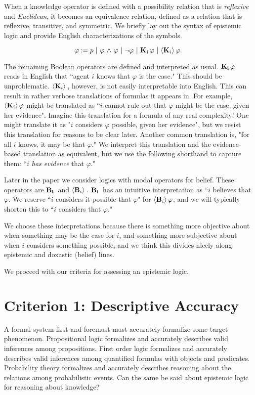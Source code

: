 When a knowledge operator is defined with a possibility relation that is \emph{reflexive} and \emph{Euclidean}, it becomes an equivalence relation, defined as a relation that is reflexive, transitive, and symmetric. We briefly lay out the syntax of epistemic logic and provide English characterizations of the symbols.

\begin{center}
$$\varphi := p\  |\  \varphi \tland \varphi\   |\ \tlnot \varphi \ |\   \Kns{i}\varphi\ |\ \Poss{i}\varphi. 
$$
\end{center}
The remaining Boolean operators are defined and interpreted as usual. $\mathbf{K}_{\mathbf{i}}\,\varphi$ reads in English that ``agent $i$ knows that $\varphi$ is the case." This should be unproblematic. $\langle \mathbf{K}_{i} \rangle\,$, however, is not easily interpretable into English. This can result in rather verbose translations of formulas it appears in. For example, $\langle \mathbf{K}_{i} \rangle\,\varphi$ might be translated as ``$i$ cannot rule out that $\varphi$ might be the case, given her evidence". Imagine this translation for a formula of any real complexity! One might translate it as "$i$ considers $\varphi$ possible, given her evidence", but we resist this translation for reasons to be clear later. Another common translation is, "for all $i$ knows, it may be that $\varphi$." We interpret this translation and the evidence-based translation as equivalent, but we use the following shorthand to capture them: ``$i$ \emph{has evidence} that $\varphi$."

Later in the paper we consider logics with modal operators for belief. These operators are $\mathbf{B}_{\mathbf{i}}\,$ and $\langle \mathbf{B}_{i} \rangle\,$. $\mathbf{B}_{\mathbf{i}}\,$ has an intuitive interpretation as ``$i$ believes that $\varphi$. We reserve ``$i$ considers it possible that $\varphi$" for $\langle \mathbf{B}_{i} \rangle\,\varphi$, and we will typically shorten this to ``$i$ considers that $\varphi$."

We choose these interpretations because there is something more objective about when something may be the case for $i$, and something more subjective about when $i$ considers something possible, and we think this divides nicely along epistemic and doxastic (belief) lines.

We proceed with our criteria for assessing an epistemic logic.

\section{Criterion 1: Descriptive Accuracy}
\label{sec:desc}
A formal system first and foremust must accurately formalize some target phenomenon. Propositional logic formalizes and accurately describes valid inferences among propositions. First order logic formalizes and accurately describes valid inferences among quantified formulas with objects and predicates. Probability theory formalizes and accurately describes reasoning about the relations among probabilistic events. Can the same be said about epistemic logic for reasoning about knowledge? 

